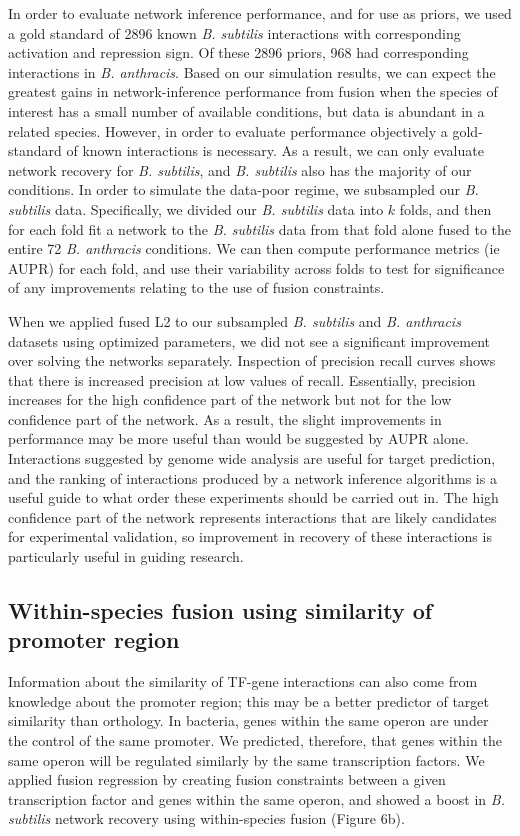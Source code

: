 \documentclass[11pt]{article}
\begin{document}
In order to evaluate network inference performance, and for use as priors, we used a gold standard of 2896 known \textit{B. subtilis} interactions with corresponding activation and repression sign. Of these 2896 priors, 968 had corresponding interactions in \textit{B. anthracis}. Based on our simulation results, we can expect the greatest gains in network-inference performance from fusion when the species of interest has a small number of available conditions, but data is abundant in a related species. However, in order to evaluate performance objectively a gold-standard of known interactions is necessary. As a result, we can only evaluate network recovery for \textit{B. subtilis}, and \textit{B. subtilis} also has the majority of our conditions. In order to simulate the data-poor regime, we subsampled our \textit{B. subtilis} data. Specifically, we divided our \textit{B. subtilis} data into $k$ folds, and then for each fold fit a network to the \textit{B. subtilis} data from that fold alone fused to the entire 72 \textit{B. anthracis} conditions. We can then compute performance metrics (ie AUPR) for each fold, and use their variability across folds to test for significance of any improvements relating to the use of fusion constraints. 

When we applied fused L2 to our subsampled \textit{B. subtilis} and \textit{B. anthracis} datasets using optimized parameters, we did not see a significant improvement over solving the networks separately. Inspection of precision recall curves shows that there is increased precision at low values of recall. Essentially, precision increases for the high confidence part of the network but not for the low confidence part of the network. As a result, the slight improvements in performance may be more useful than would be suggested by AUPR alone. Interactions suggested by genome wide analysis are useful for target prediction, and the ranking of interactions produced by a network inference algorithms is a useful guide to what order these experiments should be carried out in. The high confidence part of the network represents interactions that are likely candidates for experimental validation, so improvement in recovery of these interactions is particularly useful in guiding research. 

\subsection{Within-species fusion using similarity of promoter region}
Information about the similarity of TF-gene interactions can also come from knowledge about the promoter region; this may be a better predictor of target similarity than orthology. In bacteria, genes within the same operon are under the control of the same promoter. We predicted, therefore, that genes within the same operon will be regulated similarly by the same transcription factors. We applied fusion regression by creating fusion constraints between a given transcription factor and genes within the same operon, and showed a boost in \textit{B. subtilis} network recovery using within-species fusion (Figure 6b). 
\end{document}

